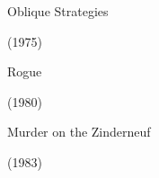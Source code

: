 \documentclass{beamer}
\begin{document}
\begin{frame}[c]
	\centering
	\Huge
	Oblique Strategies
	
	(1975)
\end{frame}

\begin{frame}[plain]
\end{frame}

\begin{frame}[c]
	\centering
	\Huge
	Rogue
	
	(1980)
\end{frame}

\begin{frame}[plain]
\end{frame}

\begin{frame}[c]
	\centering
	\Huge
	Murder on the Zinderneuf
	
	(1983)
\end{frame}
\end{document}

